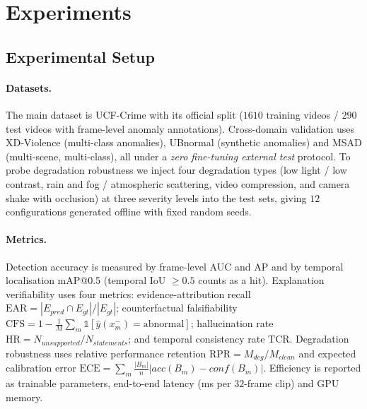 \section{Experiments}
\label{sec:exp}

\subsection{Experimental Setup}

\paragraph{Datasets.} The main dataset is UCF-Crime with its official split ($1610$ training videos / $290$ test videos with frame-level anomaly annotations). Cross-domain validation uses XD-Violence (multi-class anomalies), UBnormal (synthetic anomalies) and MSAD (multi-scene, multi-class), all under a \emph{zero fine-tuning external test} protocol. To probe degradation robustness we inject four degradation types (low light / low contrast, rain and fog / atmospheric scattering, video compression, and camera shake with occlusion) at three severity levels into the test sets, giving $12$ configurations generated offline with fixed random seeds.

\paragraph{Metrics.} Detection accuracy is measured by frame-level AUC and AP and by temporal localisation mAP@0.5 (temporal IoU $\geq 0.5$ counts as a hit). Explanation verifiability uses four metrics: evidence-attribution recall $\mathrm{EAR} = |E_{pred} \cap E_{gt}| / |E_{gt}|$; counterfactual falsifiability $\mathrm{CFS} = 1 - \frac{1}{M}\sum_m \mathbb{1}[\hat{y}(x_m^{-}) = \text{abnormal}]$; hallucination rate $\mathrm{HR} = N_{unsupported}/N_{statements}$; and temporal consistency rate $\mathrm{TCR}$. Degradation robustness uses relative performance retention $\mathrm{RPR} = M_{deg}/M_{clean}$ and expected calibration error $\mathrm{ECE} = \sum_m \frac{|B_m|}{n}|acc(B_m) - conf(B_m)|$. Efficiency is reported as trainable parameters, end-to-end latency (ms per $32$-frame clip) and GPU memory.

